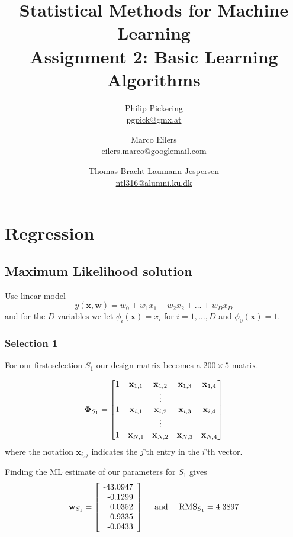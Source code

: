 \documentclass{article}
\author{Philip Pickering\\ \url{pgpick@gmx.at} \and Marco Eilers\\ \url{eilers.marco@googlemail.com} \and Thomas Bracht Laumann Jespersen\\ \url{ntl316@alumni.ku.dk}}
\title{Statistical Methods for Machine Learning\\ Assignment 2: Basic Learning Algorithms}
\date{}
\newcommand{\vect}[1]{\ensuremath{\boldsymbol{\mathbf{#1}}}\xspace}
\begin{document}
\maketitle

\section{Regression}

\subsection{Maximum Likelihood solution}

Use linear model
\[
y(\vect{x},\vect{w}) = w_0 + w_1 x_1 + w_2 x_2 + \dots + w_D x_D
\]
and for the $D$ variables we let $\phi_i(\vect{x}) = x_i$ for
$i = 1,\dots,D$ and $\phi_0(\vect{x}) = 1$. 
\subsubsection{Selection 1}

For our first selection $S_1$ our design matrix becomes a $200\times
5$ matrix.

\[
\vect{\Phi}_{S_1} = \begin{bmatrix}1 & \vect{x}_{1,1} & \vect{x}_{1,2} & \vect{x}_{1,3} & \vect{x}_{1,4}\\
\hfill & \hfill & \vdots & \hfill & \hfill\\
1 & \vect{x}_{i,1} & \vect{x}_{i,2} & \vect{x}_{i,3} & \vect{x}_{i,4}\\
\hfill & \hfill & \vdots & \hfill & \hfill\\
1 & \vect{x}_{N,1} & \vect{x}_{N,2} & \vect{x}_{N,3} & \vect{x}_{N,4}\\
\end{bmatrix}
\]
where the notation $\vect{x}_{i,j}$ indicates the $j$'th entry in the
$i$'th vector. %

Finding the ML estimate of our parameters for $S_1$ gives
\[
\vect{w}_{S_1} = \left[\!\begin{tabular}{r@{.}l} -43 & 0947\\ -0 &
  1299\\ 0 & 0352\\ 0 & 9335\\ -0 &
  0433\end{tabular}\!\right]\quad\text{ and }\quad \mathrm{RMS}_{S_1} = 4.3897
\]
\end{document}
